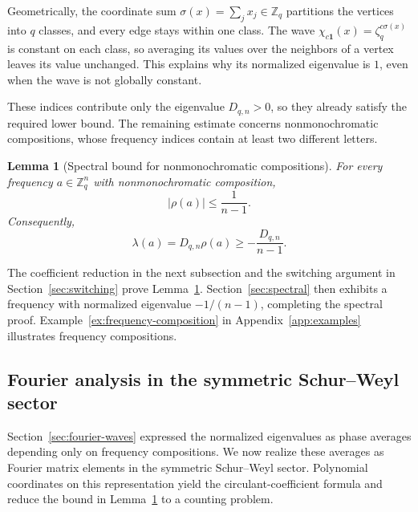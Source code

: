 \documentclass[11pt,a4paper]{article}
\numberwithin{equation}{section}
\numberwithin{figure}{section}
\numberwithin{table}{section}
\numberwithin{footnote}{section}
\newtheorem{lemma}[theorem]{Lemma}
\theoremstyle{informal}\newtheorem*{informaltheorem}{Informal theorem}
\theoremstyle{definition}\newtheorem{example}{Example}[section]
\theoremstyle{remark}\newtheorem{remark}[theorem]{Remark}
\newcommand{\Z}{\mathbb Z}
\newcommand{\one}{\mathbf 1}
\begin{document}
Geometrically, the coordinate sum
\(\sigma(x)=\sum_jx_j\in\Z_q\) partitions the vertices into
\(q\) classes, and every edge stays within one class. The wave
\(\chi_{c\one}(x)=\zeta_q^{c\sigma(x)}\) is constant on
each class, so averaging its values over the neighbors of a vertex
leaves its value unchanged. This explains why its normalized
eigenvalue is \(1\), even when the wave is not globally constant.

These indices contribute only the eigenvalue \(D_{q,n}>0\), so
they already satisfy the required lower bound. The remaining
estimate concerns nonmonochromatic compositions, whose frequency
indices contain at least two different letters.

\begin{lemma}[Spectral bound for nonmonochromatic compositions]
\label{lem:nonmonochromatic-bound}
For every frequency \(a\in\Z_q^n\) with nonmonochromatic
composition,
\begin{equation}\label{eq:nonconstant}
 |\rho(a)|\leq\frac1{n-1}.
\end{equation}
Consequently,
\begin{equation}
 \lambda(a)=D_{q,n}\rho(a)\geq-\frac{D_{q,n}}{n-1}.
\end{equation}
\end{lemma}

The coefficient reduction in the next subsection and the switching
argument in Section~\ref{sec:switching} prove
Lemma~\ref{lem:nonmonochromatic-bound}.
Section~\ref{sec:spectral} then exhibits a frequency with normalized
eigenvalue \(-1/(n-1)\), completing the spectral proof.
Example~\ref{ex:frequency-composition} in Appendix~\ref{app:examples}
illustrates frequency compositions.

\subsection{Fourier analysis in the symmetric Schur--Weyl sector}\label{sec:fourier-counts}
Section~\ref{sec:fourier-waves} expressed the normalized eigenvalues
as phase averages depending only on frequency compositions. We now
realize these averages as Fourier matrix elements in the symmetric
Schur--Weyl sector. Polynomial coordinates on this representation
yield the circulant-coefficient formula and reduce the bound in
Lemma~\ref{lem:nonmonochromatic-bound} to a counting problem.
\end{document}
